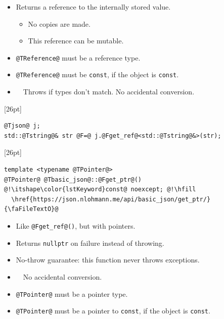 \documentclass{slides}
\makeatletter
\newcommand{\@slidetitle}{}
\newcommand{\slidetitle}[1]{\renewcommand{\@slidetitle}{#1}}
\makeatother
\begin{document}
\begin{itemize}[itemsep=0.7em]
  \item Returns a reference to the internally stored value.
    \begin{itemize}
      \item No copies are made.
      \item This reference can be mutable.
    \end{itemize}
  \item \lstinline{@TReference@} must be a reference type.
  \item \lstinline{@TReference@} must be \lstinline{const},
    if the object is \lstinline{const}.
  \item {\color{green80}\faThumbsUp}\ \ Throws if types don't match.
    No accidental conversion.
\end{itemize}

\begin{tcolorbox}{\F{19pt}[26pt]
\begin{lstlisting}
@Tjson@ j;
std::@Tstring@& str @F=@ j.@Fget_ref@<std::@Tstring@&>(str);
\end{lstlisting}
}\end{tcolorbox}

\pagebreak
\slidetitle{Value access}

\begin{tcolorbox}{\F{19pt}[26pt]
\begin{lstlisting}
template <typename @TPointer@>
@TPointer@ @Tbasic_json@::@Fget_ptr@() @!\itshape\color{lstKeyword}const@ noexcept; @!\hfill
  \href{https://json.nlohmann.me/api/basic_json/get_ptr/}{\faFileTextO}@
\end{lstlisting}
}\end{tcolorbox}
\vspace{0em}

\begin{itemize}[itemsep=0.7em]
  \item Like \lstinline{@Fget_ref@()}, but with pointers.
  \item Returns \lstinline{nullptr} on failure instead of throwing.
  \item No-throw guarantee: this function never throws exceptions.
  \item {\color{green80}\faThumbsUp}\ \ No accidental conversion.
  \item \lstinline{@TPointer@} must be a pointer type.
  \item \lstinline{@TPointer@} must be a pointer to \lstinline{const},
    if the object is \lstinline{const}.
\end{itemize}
\end{document}
